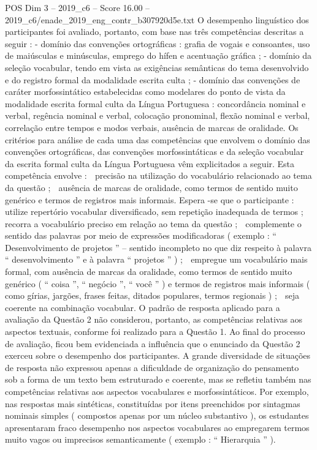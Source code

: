 \begin{textsample}{POS Dim 3 – 2019\_c6 – Score 16.00 – 2019\_c6/enade\_2019\_eng\_contr\_b307920d5e.txt}
O desempenho linguístico dos participantes foi avaliado, portanto, com base nas três competências descritas a seguir : - domínio das convenções ortográficas : grafia de vogais e consoantes, uso de maiúsculas e minúsculas, emprego do hífen e acentuação gráfica ; - domínio da seleção vocabular, tendo em vista as exigências semânticas do tema desenvolvido e do registro formal da modalidade escrita culta ; - domínio das convenções de caráter morfossintático estabelecidas como modelares do ponto de vista da modalidade escrita formal culta da Língua Portuguesa : concordância nominal e verbal, regência nominal e verbal, colocação pronominal, flexão nominal e verbal, correlação entre tempos e modos verbais, ausência de marcas de oralidade.
Os critérios para análise de cada uma das competências que envolvem o domínio das convenções ortográficas, das convenções morfossintáticas e da seleção vocabular da escrita formal culta da Língua Portuguesa vêm explicitados a seguir.
Esta competência envolve :  precisão na utilização do vocabulário relacionado ao tema da questão ;  ausência de marcas de oralidade, como termos de sentido muito genérico e termos de registros mais informais.
Espera -se que o participante :  utilize repertório vocabular diversificado, sem repetição inadequada de termos ;  recorra a vocabulário preciso em relação ao tema da questão ;  complemente o sentido das palavras por meio de expressões modificadoras ( exemplo : “ Desenvolvimento de projetos ” – sentido incompleto no que diz respeito à palavra “ desenvolvimento ” e à palavra “ projetos ” ) ;  empregue um vocabulário mais formal, com ausência de marcas da oralidade, como termos de sentido muito genérico ( “ coisa ”, “ negócio ”, “ você ” ) e termos de registros mais informais ( como gírias, jargões, frases feitas, ditados populares, termos regionais ) ;  seja coerente na combinação vocabular.
O padrão de resposta aplicado para a avaliação da Questão 2 não considerou, portanto, as competências relativas aos aspectos textuais, conforme foi realizado para a Questão 1.
Ao final do processo de avaliação, ficou bem evidenciada a influência que o enunciado da Questão 2 exerceu sobre o desempenho dos participantes.
A grande diversidade de situações de resposta não expressou apenas a dificuldade de organização do pensamento sob a forma de um texto bem estruturado e coerente, mas se refletiu também nas competências relativas aos aspectos vocabulares e morfossintáticos.
Por exemplo, nas respostas mais sintéticas, constituídas por itens preenchidos por sintagmas nominais simples ( compostos apenas por um núcleo substantivo ), os estudantes apresentaram fraco desempenho nos aspectos vocabulares ao empregarem termos muito vagos ou imprecisos semanticamente ( exemplo : “ Hierarquia ” ).

\end{textsample}
